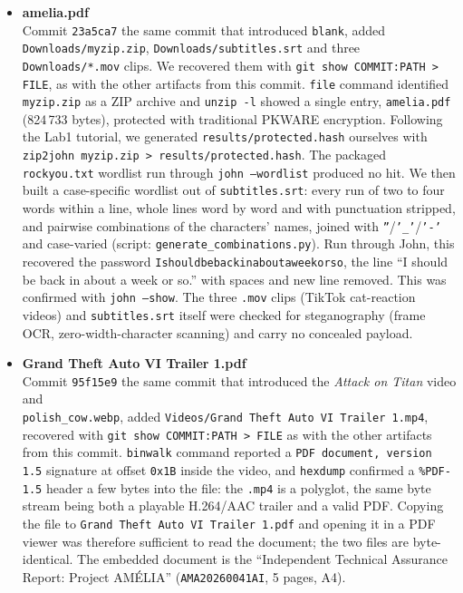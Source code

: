 \documentclass[11pt,a4paper,final,oneside]{article}
\begin{document}
\begin{itemize}
  \item \textbf{amelia.pdf}
  \\ Commit \texttt{23a5ca7} the same commit that introduced \texttt{blank}, added \texttt{Downloads/myzip.zip}, \texttt{Downloads/subtitles.srt} and three \texttt{Downloads/*.mov} clips. We recovered them with \texttt{git show COMMIT:PATH > FILE}, as with the other artifacts from this commit. \texttt{file} command identified \texttt{myzip.zip} as a ZIP archive and \texttt{unzip -l} showed a single entry, \texttt{amelia.pdf} (824\,733 bytes), protected with traditional PKWARE encryption. Following the Lab1 tutorial, we generated \texttt{results/protected.hash} ourselves with\\ \texttt{zip2john myzip.zip > results/protected.hash}. The packaged \texttt{rockyou.txt} wordlist run through \texttt{john --wordlist} produced no hit. We then built a case-specific wordlist out of \texttt{subtitles.srt}: every run of two to four words within a line, whole lines word by word and with punctuation stripped, and pairwise combinations of the characters' names, joined with \texttt{''}/\texttt{'\_'}/\texttt{'-'} and case-varied (script: \texttt{generate\_combinations.py}). Run through John, this recovered the password \texttt{Ishouldbebackinaboutaweekorso}, the line ``I should be back in about a week or so.'' with spaces and new line removed. This was confirmed with \texttt{john --show}. The three \texttt{.mov} clips (TikTok cat-reaction videos) and \texttt{subtitles.srt} itself were checked for steganography (frame OCR, zero-width-character scanning) and carry no concealed payload.

  \item \textbf{Grand Theft Auto VI Trailer 1.pdf}
  \\ Commit \texttt{95f15e9} the same commit that introduced the \textit{Attack on Titan} video and \\ \texttt{polish\_cow.webp}, added \texttt{Videos/Grand Theft Auto VI Trailer 1.mp4}, recovered with \texttt{git show COMMIT:PATH > FILE} as with the other artifacts from this commit. \texttt{binwalk} command reported a \texttt{PDF document, version 1.5} signature at offset \texttt{0x1B} inside the video, and \texttt{hexdump} confirmed a \texttt{\%PDF-1.5} header a few bytes into the file: the \texttt{.mp4} is a polyglot, the same byte stream being both a playable H.264/AAC trailer and a valid PDF. Copying the file to \texttt{Grand Theft Auto VI Trailer 1.pdf} and opening it in a PDF viewer was therefore sufficient to read the document; the two files are byte-identical. The embedded document is the ``Independent Technical Assurance Report: Project AMÉLIA'' (\texttt{AMA20260041AI}, 5 pages, A4).
  \end{itemize}
\end{document}
